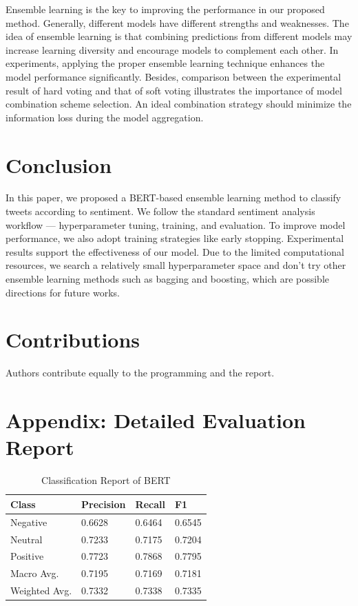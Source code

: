 \documentclass[runningheads]{llncs}
\begin{document}
Ensemble learning is the key to improving the performance in our proposed method. Generally, different models have different strengths and weaknesses. The idea of ensemble learning is that combining predictions from different models may increase learning diversity and encourage models to complement each other. In experiments, applying the proper ensemble learning technique enhances the model performance significantly. Besides, comparison between the experimental result of hard voting and that of soft voting illustrates the importance of model combination scheme selection. An ideal combination strategy should minimize the information loss during the model aggregation.

\section{Conclusion}
In this paper, we proposed a BERT-based ensemble learning method to classify tweets according to sentiment. We follow the standard sentiment analysis workflow --- hyperparameter tuning, training, and evaluation. To improve model performance, we also adopt training strategies like early stopping. Experimental results support the effectiveness of our model. Due to the limited computational resources, we search a relatively small hyperparameter space and don't try other ensemble learning methods such as bagging and boosting, which are possible directions for future works.
 
\section{Contributions}
Authors contribute equally to the programming and the report.

%
%


%

\section*{Appendix: Detailed Evaluation Report}
\begin{table}[!ht]
    \centering
    \caption{Classification Report of BERT}
    \begin{tabular}{llll}
        \toprule
        \textbf{Class} & \textbf{Precision} & \textbf{Recall} & \textbf{F1}\\
        \midrule
         Negative       & 0.6628  & 0.6464  & 0.6545 \\ 
         Neutral       & 0.7233  & 0.7175  & 0.7204 \\
         Positive       & 0.7723  & 0.7868  & 0.7795 \\
        \midrule
   Macro Avg.  & 0.7195  & 0.7169  & 0.7181 \\
Weighted Avg.  & 0.7332  & 0.7338  & 0.7335 \\
        \bottomrule
    \end{tabular}
\end{table}
\end{document}
